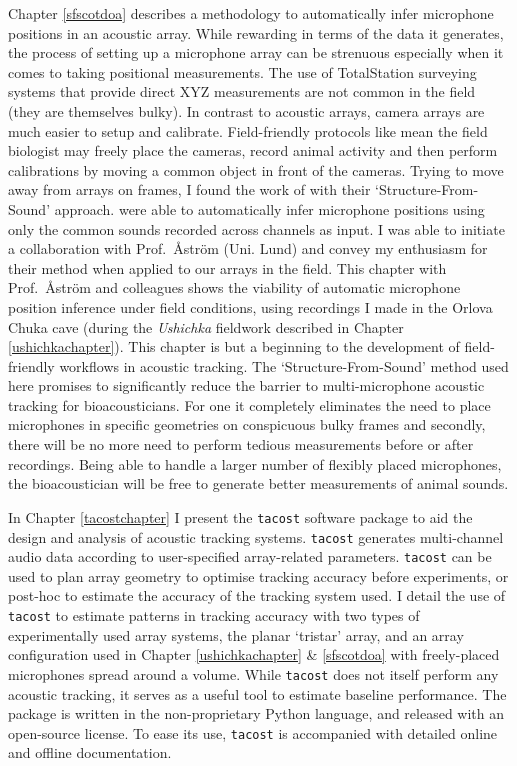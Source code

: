 \documentclass[
]{book}
\begin{document}
Chapter \ref{sfscotdoa} describes a methodology to automatically infer microphone positions in an acoustic array. While rewarding in terms of the data it generates, the process of setting up a microphone array can be strenuous especially when it comes to taking positional measurements. The use of TotalStation surveying systems that provide direct XYZ measurements are not common in the field (they are themselves bulky). In contrast to acoustic arrays, camera arrays are much easier to setup and calibrate. Field-friendly protocols like \citet{Theriault2014} mean the field biologist may freely place the cameras, record animal activity and then perform calibrations by moving a common object in front of the cameras. Trying to move away from arrays on frames, I found the work of \citet{zhayida2016automatic} with their `Structure-From-Sound' approach. \citet{zhayida2016automatic} were able to automatically infer microphone positions using only the common sounds recorded across channels as input. I was able to initiate a collaboration with Prof.~Åström (Uni. Lund) and convey my enthusiasm for their method when applied to our arrays in the field. This chapter with Prof.~Åström and colleagues shows the viability of automatic microphone position inference under field conditions, using recordings I made in the Orlova Chuka cave (during the \emph{Ushichka} fieldwork described in Chapter \ref{ushichkachapter}). This chapter is but a beginning to the development of field-friendly workflows in acoustic tracking. The `Structure-From-Sound' method used here promises to significantly reduce the barrier to multi-microphone acoustic tracking for bioacousticians. For one it completely eliminates the need to place microphones in specific geometries on conspicuous bulky frames and secondly, there will be no more need to perform tedious measurements before or after recordings. Being able to handle a larger number of flexibly placed microphones, the bioacoustician will be free to generate better measurements of animal sounds.

In Chapter \ref{tacostchapter} I present the \texttt{tacost} software package to aid the design and analysis of acoustic tracking systems. \texttt{tacost} generates multi-channel audio data according to user-specified array-related parameters. \texttt{tacost} can be used to plan array geometry to optimise tracking accuracy before experiments, or post-hoc to estimate the accuracy of the tracking system used. I detail the use of \texttt{tacost} to estimate patterns in tracking accuracy with two types of experimentally used array systems, the planar `tristar' array, and an array configuration used in Chapter \ref{ushichkachapter} \& \ref{sfscotdoa} with freely-placed microphones spread around a volume. While \texttt{tacost} does not itself perform any acoustic tracking, it serves as a useful tool to estimate baseline performance. The package is written in the non-proprietary Python language, and released with an open-source license. To ease its use, \texttt{tacost} is accompanied with detailed online and offline documentation.
\end{document}
